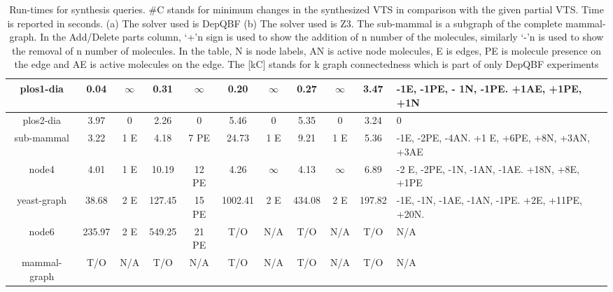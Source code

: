 \begin{table}[t]
{\begin{tabular}[t]{|c@{}|@{}c@{}|@{}c@{}|@{}c@{}|@{}c@{}|@{}c@{}|@{}c@{}|@{}c@{}|@{}c@{}|@{}c@{}|@{}C{4cm}@{}|}
		plos1-dia & 0.04&$\infty$& 0.31 &$\infty$& 0.20 & $\infty$ & 0.27&$\infty$& 3.47 & -1E, -1PE, - 1N, -1PE. +1AE, +1PE, +1N\\\hline
		plos2-dia & 3.97 & 0 &  2.26 & 0  & 5.46 & 0 & 5.35 & 0 & 3.24 & 0 \\\hline
		sub-mammal & 3.22 & 1 E  & 4.18 & 7 PE  & 24.73 & 1 E  & 9.21 & 1 E & 5.36  & -1E, -2PE, -4AN. +1 E, +6PE, +8N, +3AN, +3AE \\\hline
		node4  & 4.01  & 1 E  & 10.19  & 12 PE & 4.26  & $\infty$ & 4.13 &$\infty$&  6.89  & -2 E, -2PE, -1N, -1AN, -1AE. +18N, +8E, +1PE \\\hline
		yeast-graph & 38.68  & 2 E  &   127.45  & 15 PE   & 1002.41  & 2 E  & 434.08   & 2 E & 197.82  &  -1E, -1N, -1AE, -1AN, -1PE. +2E, +11PE, +20N. \\\hline
		node6  &  235.97  & 2 E  &  549.25    & 21 PE    &  T/O  & N/A      &  T/O   &  N/A   &  T/O     & N/A \\\hline
		mammal-graph   &  T/O     & N/A  &  T/O    & N/A    &  T/O  & N/A      &  T/O   &  N/A   &  T/O     & N/A\\\hline
	\end{tabular}}
	\caption{Run-times for synthesis queries. \#C stands for minimum changes in the synthesized VTS in comparison with the given partial VTS. Time is reported in seconds. (a) The solver used is DepQBF (b) The solver used is Z3. The sub-mammal is a subgraph of the complete mammal-graph. In the Add/Delete parts column, ‘+’n sign is used to show the addition of n number of the molecules, similarly ‘-’n is used to show the removal of n number of molecules. In the table, N is node labels, AN is active node molecules, E is edges, PE is molecule presence on the edge and AE is active molecules on the edge. The [kC] stands for k graph connectedness which is part of only DepQBF experiments}
	
	\label{tab:synth-graph}
	\end{table}

